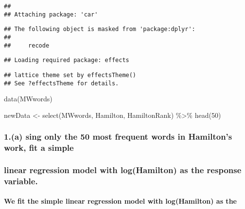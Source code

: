 \documentclass[
]{article}
\newenvironment{Shaded}{\begin{snugshade}}{\end{snugshade}}
\newcommand{\DecValTok}[1]{\textcolor[rgb]{0.00,0.00,0.81}{#1}}
\newcommand{\FunctionTok}[1]{\textcolor[rgb]{0.00,0.00,0.00}{#1}}
\newcommand{\NormalTok}[1]{#1}
\newcommand{\OtherTok}[1]{\textcolor[rgb]{0.56,0.35,0.01}{#1}}
\newcommand{\SpecialCharTok}[1]{\textcolor[rgb]{0.00,0.00,0.00}{#1}}
\begin{document}
\begin{verbatim}
## 
## Attaching package: 'car'
\end{verbatim}

\begin{verbatim}
## The following object is masked from 'package:dplyr':
## 
##     recode
\end{verbatim}

\begin{verbatim}
## Loading required package: effects
\end{verbatim}

\begin{verbatim}
## lattice theme set by effectsTheme()
## See ?effectsTheme for details.
\end{verbatim}

\begin{Shaded}
\begin{Highlighting}[]
\FunctionTok{data}\NormalTok{(MWwords)}
\end{Highlighting}
\end{Shaded}

\begin{Shaded}
\begin{Highlighting}[]
\NormalTok{newData }\OtherTok{\textless{}{-}} \FunctionTok{select}\NormalTok{(MWwords, Hamilton, HamiltonRank) }\SpecialCharTok{\%\textgreater{}\%} \FunctionTok{head}\NormalTok{(}\DecValTok{50}\NormalTok{)}
\end{Highlighting}
\end{Shaded}

\hypertarget{a-sing-only-the-50-most-frequent-words-in-hamiltons-work-fit-a-simple}{%
\subsubsection{1.(a) sing only the 50 most frequent words in Hamilton's
work, fit a
simple}\label{a-sing-only-the-50-most-frequent-words-in-hamiltons-work-fit-a-simple}}

\hypertarget{linear-regression-model-with-loghamilton-as-the-response-variable.}{%
\subsubsection{linear regression model with log(Hamilton) as the
response
variable.}\label{linear-regression-model-with-loghamilton-as-the-response-variable.}}

\hypertarget{we-fit-the-simple-linear-regression-model-with-loghamilton-as-the}{%
\paragraph{We fit the simple linear regression model with log(Hamilton)
as
the}\label{we-fit-the-simple-linear-regression-model-with-loghamilton-as-the}}
\end{document}
